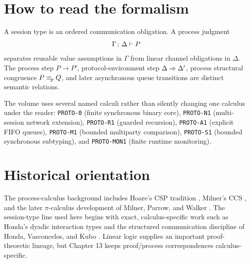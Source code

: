 \documentclass[11pt,openany]{book}
\begin{document}
\chapter*{How to read the formalism}
A session type is an ordered communication obligation. A process judgment
\[
  \Gamma\,;\,\Delta \vdash P
\]
separates reusable value assumptions in \(\Gamma\) from linear channel obligations in
\(\Delta\). The process step \(P\to P'\), protocol-environment step
\(\Delta\Rightarrow\Delta'\), process structural congruence \(P\equiv_{\!p} Q\), and later
asynchronous queue transitions are distinct semantic relations.

The volume uses several named calculi rather than silently changing one calculus under the reader:
\texttt{PROTO-0} (finite synchronous binary core), \texttt{PROTO-N1} (multi-session network
extension), \texttt{PROTO-R1} (guarded recursion), \texttt{PROTO-A1} (explicit FIFO queues),
\texttt{PROTO-M1} (bounded multiparty comparison), \texttt{PROTO-S1} (bounded synchronous
subtyping), and \texttt{PROTO-MON1} (finite runtime monitoring).

\chapter*{Historical orientation}
The process-calculus background includes Hoare's CSP tradition \cite{hoare1978}, Milner's CCS
\cite{milner1980}, and the later \(\pi\)-calculus development of Milner, Parrow, and Walker
\cite{milner1992}. The session-type line used here begins with exact, calculus-specific work such
as Honda's dyadic interaction types \cite{honda1993} and the structured communication discipline
of Honda, Vasconcelos, and Kubo \cite{honda1998}. Linear logic \cite{girard1987} supplies an
important proof-theoretic lineage, but Chapter 13 keeps proof/process correspondences
calculus-specific.

\tableofcontents
\end{document}
